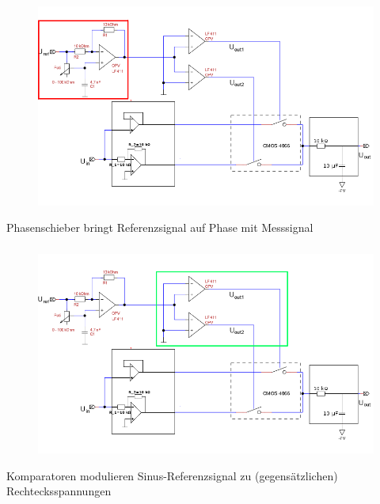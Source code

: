 \begin{frame}
    \frametitle{}
    \framesubtitle{}
    \begin{figure}[H]
    \begin{center}
            \includegraphics[scale=0.4]{./img/schaltung/gesamt_phase.png}
    \end{center}
    \end{figure}
    \begin{block}{}
        Phasenschieber bringt Referenzsignal auf Phase mit Messsignal
    \end{block}
\end{frame}
\begin{frame}
    \frametitle{}
    \framesubtitle{}
    \begin{figure}[H]
    \begin{center}
            \includegraphics[scale=0.4]{./img/schaltung/gesamt_komp.png}
    \end{center}
    \end{figure}
    \begin{block}{}
        Komparatoren modulieren Sinus-Referenzsignal zu (gegensätzlichen) Rechtecksspannungen 
    \end{block}
\end{frame}
